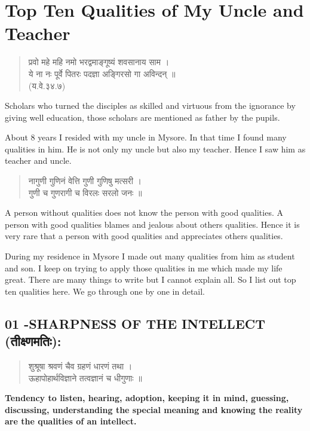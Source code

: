 \chapter{Top Ten Qualities of My Uncle and Teacher}

\begin{center}
\smallskip

\end{center}
\begin{verse}
प्रवो महे महि नमो भरद्वमाङ्गूष्यं शवसानाय साम ।\\
ये ना नः पूर्वे पितरः पदज्ञा अङ्गिरसो गा अविन्दन् ॥\\
(य.वे.३४.७)
\end{verse}
Scholars who turned the disciples as skilled and virtuous from the ignorance by giving well education, those scholars are mentioned as father by the pupils.

About 8 years I resided with my uncle in Mysore. In that time I found many qualities in him. He is not only my uncle but also my teacher. Hence I saw him as teacher and uncle.
\begin{verse}
नागुणी गुणिनं वेत्ति गुणी गुणिषु मत्सरी ।\\
गुणी च गुणरागी च विरलः सरलो जनः ॥
\end{verse}
A person without qualities does not know the person with good qualities. A person with good qualities blames and jealous about others qualities. Hence it is very rare that a person with good qualities and appreciates others qualities.

During my residence in Mysore I made out many qualities from him as student and son. I keep on trying to apply those qualities in me which made my life great. There are many things to write but I cannot explain all. So I list out top ten qualities here. We go through one by one in detail.

\section*{01 -SHARPNESS OF THE INTELLECT (तीक्ष्णमतिः):}

\begin{verse}
शुश्रूषा श्रवणं चैव ग्रहणं धारणं तथा ।\\
ऊहापोहार्थविज्ञाने तत्वज्ञानं च धीगुणाः ॥
\end{verse}
\textbf{Tendency to listen, hearing, adoption, keeping it in mind, guessing, discussing, understanding the special meaning and knowing the reality are the qualities of an intellect.}

